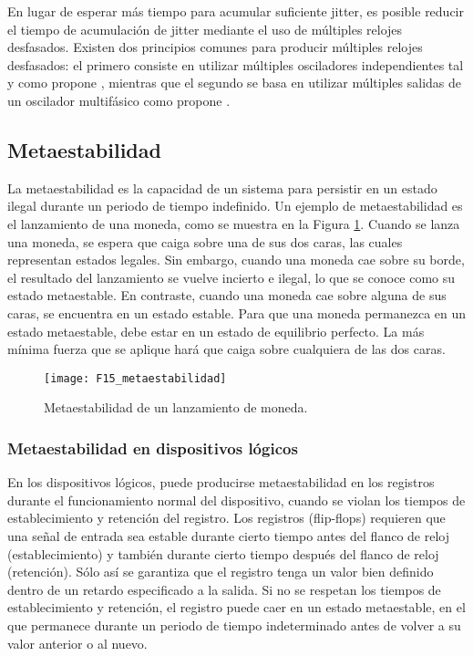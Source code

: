                 En lugar de esperar más tiempo para acumular suficiente jitter, es posible reducir el tiempo de acumulación de jitter mediante el uso de múltiples relojes desfasados.  Existen dos principios comunes para producir múltiples relojes desfasados: el primero consiste en utilizar múltiples osciladores independientes tal y como propone \cite{Sunar2007}, mientras que el segundo se basa en utilizar múltiples salidas de un oscilador multifásico como propone \cite{Cherkaoui2013}.

        \subsection{Metaestabilidad}
            
            La metaestabilidad es la capacidad de un sistema para persistir en un estado ilegal durante un periodo de tiempo indefinido. Un ejemplo de metaestabilidad es el lanzamiento de una moneda, como se muestra en la Figura \ref{fig:F15_metaestabilidad}. Cuando se lanza una moneda, se espera que caiga sobre una de sus dos caras, las cuales representan estados legales. Sin embargo, cuando una moneda cae sobre su borde, el resultado del lanzamiento se vuelve incierto e ilegal, lo que se conoce como su estado metaestable. En contraste, cuando una moneda cae sobre alguna de sus caras, se encuentra en un estado estable. Para que una moneda permanezca en un estado metaestable, debe estar en un estado de equilibrio perfecto. La más mínima fuerza que se aplique hará que caiga sobre cualquiera de las dos caras.
            
            \begin{figure}[hbtp]
                \caption{Metaestabilidad de un lanzamiento de moneda.}
                \centering
                \texttt{[image: F15\_metaestabilidad]}
                \label{fig:F15_metaestabilidad}
            \end{figure}

            \subsubsection{Metaestabilidad en dispositivos lógicos}
                En los dispositivos lógicos, puede producirse metaestabilidad en los registros durante el funcionamiento normal del dispositivo, cuando se violan los tiempos de establecimiento y retención del registro. Los registros (flip-flops) requieren que una señal de entrada sea estable durante cierto tiempo antes del flanco de reloj (establecimiento) y también durante cierto tiempo después del flanco de reloj (retención). Sólo así se garantiza que el registro tenga un valor bien definido dentro de un retardo especificado a la salida. Si no se respetan los tiempos de establecimiento y retención, el registro puede caer en un estado metaestable, en el que permanece durante un periodo de tiempo indeterminado antes de volver a su valor anterior o al nuevo.


